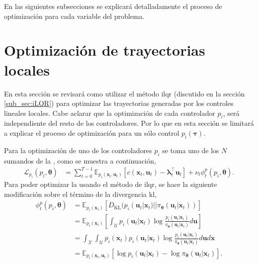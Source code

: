 En las siguientes subsecciones se explicará detalladamente el proceso de optimización para cada variable del problema.

\section{Optimización de trayectorias locales}
En esta sección se revisará como utilizar el método \acrshort{ilqr} (discutido en la sección \ref{sub_sec:iLQR}) para optimizar las trayectorias generadas por los controles lineales locales. Cabe aclarar que la optimización de cada controlador $p_i$, será independiente del resto de los controladores. Por lo que en esta sección se limitará a explicar el proceso de optimización para un sólo control $p_i(\bm\tau)$. 

Para la optimización de uno de los controladores $p_i$ se toma uno de los $N$ sumandos de la , como se muestra a continuación, 
\begin{align}
    \mathcal{L}_{p_i}(p_i, \bm\theta) &= \sum_{t=0}^{T-1}\mathbb{E}_{p_i(\mathbf{x}_t, \mathbf{u}_t)}\left[c(\mathbf{x}_t, \mathbf{u}_t)-\bm{\lambda}_t^{\top}\mathbf{u}_t
    \right] + \nu_t \phi_{t}^{p}(p_i, \bm\theta).
    \label{eq:local_opt}
\end{align}
Para poder optimizar la  usando el método de \acrshort{ilqr}, se hace la siguiente modificación sobre el término de la divergencia \acrshort{kl}, 
\begin{equation}
    \begin{aligned}
    \phi_{t}^{p}(p_i, \bm\theta) &= \mathbb{E}_{p_i(\mathbf{x}_t)} \left[D_{\text{KL}}(p_i(\mathbf{u}_t|\mathbf{x}_t)|| \pi_{\bm\theta}(\mathbf{u}_{t}| \mathbf{x}_t))\right] \\
    &= \mathbb{E}_{p_i(\mathbf{x}_t)}\left[\int_{\mathcal{U}}p_i(\mathbf{u}_t|\mathbf{x}_t) \log \frac{p_i(\mathbf{u}_t | \mathbf{x}_t)}{\pi_{\bm\theta}(\mathbf{u}_t|\mathbf{x}_t)}d\mathbf{u}\right]\\
    &= \int_{\mathcal{X}}\int_{\mathcal{U}}p_i(\mathbf{x}_t)p_i(\mathbf{u}_t|\mathbf{x}_t) \log \frac{p_i(\mathbf{u}_t | \mathbf{x}_t)}{\pi_{\bm\theta}(\mathbf{u}_t|\mathbf{x}_t)}d\mathbf{u}d\mathbf{x}\\ 
    &= \mathbb{E}_{p_i(\mathbf{x}_t, \mathbf{u}_t)}\left[\log p_i(\mathbf{u}_t|\mathbf{x}_t) - \log \pi_{\bm\theta}(\mathbf{u}_t|\mathbf{x}_t)\right].\\
    \end{aligned}
\end{equation}
